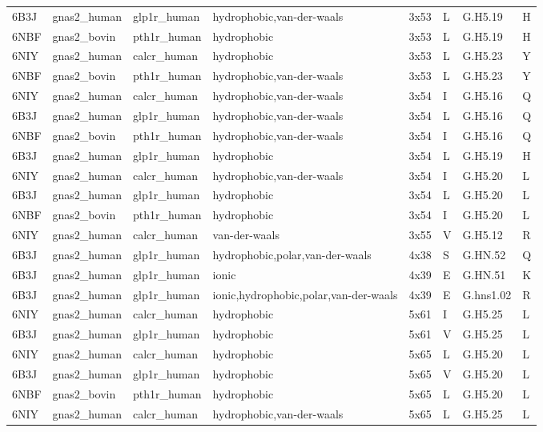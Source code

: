 \begin{landscape}
\begin{longtable}{llllllll}
\addlinespace
6B3J & gnas2\_human & glp1r\_human & hydrophobic,van-der-waals & 3x53 & L & G.H5.19 & H\\
6NBF & gnas2\_bovin & pth1r\_human & hydrophobic & 3x53 & L & G.H5.19 & H\\
6NIY & gnas2\_human & calcr\_human & hydrophobic & 3x53 & L & G.H5.23 & Y\\
6NBF & gnas2\_bovin & pth1r\_human & hydrophobic,van-der-waals & 3x53 & L & G.H5.23 & Y\\
6NIY & gnas2\_human & calcr\_human & hydrophobic,van-der-waals & 3x54 & I & G.H5.16 & Q\\
\addlinespace
6B3J & gnas2\_human & glp1r\_human & hydrophobic,van-der-waals & 3x54 & L & G.H5.16 & Q\\
6NBF & gnas2\_bovin & pth1r\_human & hydrophobic,van-der-waals & 3x54 & I & G.H5.16 & Q\\
6B3J & gnas2\_human & glp1r\_human & hydrophobic & 3x54 & L & G.H5.19 & H\\
6NIY & gnas2\_human & calcr\_human & hydrophobic,van-der-waals & 3x54 & I & G.H5.20 & L\\
6B3J & gnas2\_human & glp1r\_human & hydrophobic & 3x54 & L & G.H5.20 & L\\
\addlinespace
6NBF & gnas2\_bovin & pth1r\_human & hydrophobic & 3x54 & I & G.H5.20 & L\\
6NIY & gnas2\_human & calcr\_human & van-der-waals & 3x55 & V & G.H5.12 & R\\
6B3J & gnas2\_human & glp1r\_human & hydrophobic,polar,van-der-waals & 4x38 & S & G.HN.52 & Q\\
6B3J & gnas2\_human & glp1r\_human & ionic & 4x39 & E & G.HN.51 & K\\
6B3J & gnas2\_human & glp1r\_human & ionic,hydrophobic,polar,van-der-waals & 4x39 & E & G.hns1.02 & R\\
\addlinespace
6NIY & gnas2\_human & calcr\_human & hydrophobic & 5x61 & I & G.H5.25 & L\\
6B3J & gnas2\_human & glp1r\_human & hydrophobic & 5x61 & V & G.H5.25 & L\\
6NIY & gnas2\_human & calcr\_human & hydrophobic & 5x65 & L & G.H5.20 & L\\
6B3J & gnas2\_human & glp1r\_human & hydrophobic & 5x65 & V & G.H5.20 & L\\
6NBF & gnas2\_bovin & pth1r\_human & hydrophobic & 5x65 & L & G.H5.20 & L\\
\addlinespace
6NIY & gnas2\_human & calcr\_human & hydrophobic,van-der-waals & 5x65 & L & G.H5.25 & L\\

\end{longtable}
\end{landscape}
